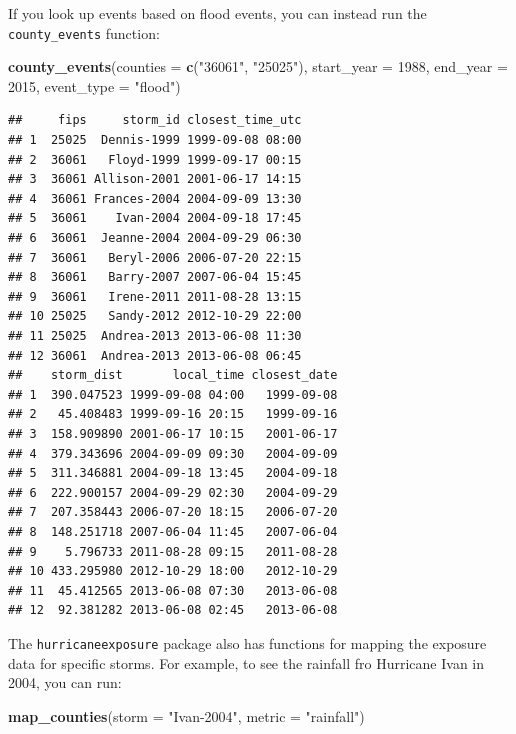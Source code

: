 \documentclass[]{tufte-book}
\newenvironment{Shaded}{}{}
\newcommand{\DataTypeTok}[1]{\textcolor[rgb]{0.56,0.13,0.00}{#1}}
\newcommand{\DecValTok}[1]{\textcolor[rgb]{0.25,0.63,0.44}{#1}}
\newcommand{\KeywordTok}[1]{\textcolor[rgb]{0.00,0.44,0.13}{\textbf{#1}}}
\newcommand{\NormalTok}[1]{#1}
\newcommand{\StringTok}[1]{\textcolor[rgb]{0.25,0.44,0.63}{#1}}
\begin{document}
If you look up events based on flood events, you can instead run the
\texttt{county\_events} function:

\begin{Shaded}
\begin{Highlighting}[]
\KeywordTok{county_events}\NormalTok{(}\DataTypeTok{counties =} \KeywordTok{c}\NormalTok{(}\StringTok{"36061"}\NormalTok{, }\StringTok{"25025"}\NormalTok{), }
    \DataTypeTok{start_year =} \DecValTok{1988}\NormalTok{, }\DataTypeTok{end_year =} \DecValTok{2015}\NormalTok{, }\DataTypeTok{event_type =} \StringTok{"flood"}\NormalTok{)}
\end{Highlighting}
\end{Shaded}

\begin{verbatim}
##     fips     storm_id closest_time_utc
## 1  25025  Dennis-1999 1999-09-08 08:00
## 2  36061   Floyd-1999 1999-09-17 00:15
## 3  36061 Allison-2001 2001-06-17 14:15
## 4  36061 Frances-2004 2004-09-09 13:30
## 5  36061    Ivan-2004 2004-09-18 17:45
## 6  36061  Jeanne-2004 2004-09-29 06:30
## 7  36061   Beryl-2006 2006-07-20 22:15
## 8  36061   Barry-2007 2007-06-04 15:45
## 9  36061   Irene-2011 2011-08-28 13:15
## 10 25025   Sandy-2012 2012-10-29 22:00
## 11 25025  Andrea-2013 2013-06-08 11:30
## 12 36061  Andrea-2013 2013-06-08 06:45
##    storm_dist       local_time closest_date
## 1  390.047523 1999-09-08 04:00   1999-09-08
## 2   45.408483 1999-09-16 20:15   1999-09-16
## 3  158.909890 2001-06-17 10:15   2001-06-17
## 4  379.343696 2004-09-09 09:30   2004-09-09
## 5  311.346881 2004-09-18 13:45   2004-09-18
## 6  222.900157 2004-09-29 02:30   2004-09-29
## 7  207.358443 2006-07-20 18:15   2006-07-20
## 8  148.251718 2007-06-04 11:45   2007-06-04
## 9    5.796733 2011-08-28 09:15   2011-08-28
## 10 433.295980 2012-10-29 18:00   2012-10-29
## 11  45.412565 2013-06-08 07:30   2013-06-08
## 12  92.381282 2013-06-08 02:45   2013-06-08
\end{verbatim}

The \texttt{hurricaneexposure} package also has functions for mapping the exposure
data for specific storms. For example, to see the rainfall fro Hurricane Ivan in
2004, you can run:

\begin{Shaded}
\begin{Highlighting}[]
\KeywordTok{map_counties}\NormalTok{(}\DataTypeTok{storm =} \StringTok{"Ivan-2004"}\NormalTok{, }\DataTypeTok{metric =} \StringTok{"rainfall"}\NormalTok{)}
\end{Highlighting}
\end{Shaded}
\end{document}
